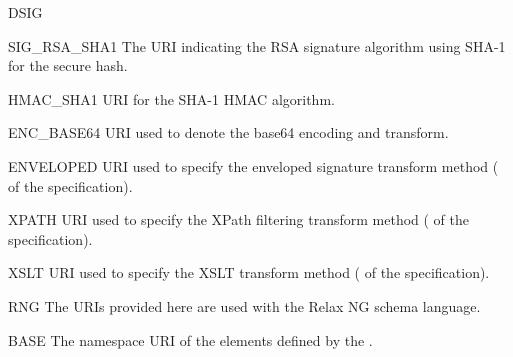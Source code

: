 \documentclass{howto}
\begin{document}
\begin{classdesc*}{DSIG}
  \begin{memberdesc}{SIG_RSA_SHA1}
    The URI indicating the RSA signature algorithm using SHA-1 for the
    secure hash.
  \end{memberdesc}

  \begin{memberdesc}{HMAC_SHA1}
    URI for the SHA-1 HMAC algorithm.
  \end{memberdesc}

  \begin{memberdesc}{ENC_BASE64}
    URI used to denote the base64 encoding and transform.
  \end{memberdesc}

  \begin{memberdesc}{ENVELOPED}
    URI used to specify the enveloped signature transform method
    (
    of the specification).
  \end{memberdesc}

  \begin{memberdesc}{XPATH}
    URI used to specify the XPath filtering transform method
    ( of the
    specification).
  \end{memberdesc}

  \begin{memberdesc}{XSLT}
    URI used to specify the XSLT transform method ( of the
    specification).
  \end{memberdesc}
\end{classdesc*}


\begin{classdesc*}{RNG}
  The URIs provided here are used with the Relax NG schema language.

  \begin{memberdesc}{BASE}
    The namespace URI of the elements defined by the
    .
  \end{memberdesc}
\end{classdesc*}
\end{document}
